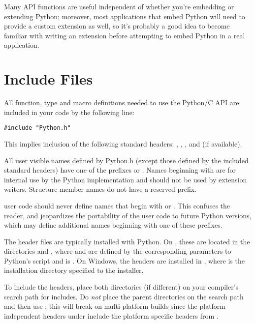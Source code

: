 \documentclass{manual}
\begin{document}
Many API functions are useful independent of whether you're embedding 
or extending Python; moreover, most applications that embed Python 
will need to provide a custom extension as well, so it's probably a 
good idea to become familiar with writing an extension before 
attempting to embed Python in a real application.


\section{Include Files \label{includes}}

All function, type and macro definitions needed to use the Python/C
API are included in your code by the following line:

\begin{verbatim}
#include "Python.h"
\end{verbatim}

This implies inclusion of the following standard headers:
, , , and
 (if available).

All user visible names defined by Python.h (except those defined by
the included standard headers) have one of the prefixes  or
.  Names beginning with  are for internal use by
the Python implementation and should not be used by extension writers.
Structure member names do not have a reserved prefix.

 user code should never define names that begin
with  or .  This confuses the reader, and
jeopardizes the portability of the user code to future Python
versions, which may define additional names beginning with one of
these prefixes.

The header files are typically installed with Python.  On \UNIX, these 
are located in the directories
 and
, where
 and  are defined by the
corresponding parameters to Python's  script and
 is .  On Windows, the headers are
installed in , where  is
the installation directory specified to the installer.

To include the headers, place both directories (if different) on your
compiler's search path for includes.  Do \emph{not} place the parent
directories on the search path and then use
; this will break on
multi-platform builds since the platform independent headers under
 include the platform specific headers from
.
\end{document}
